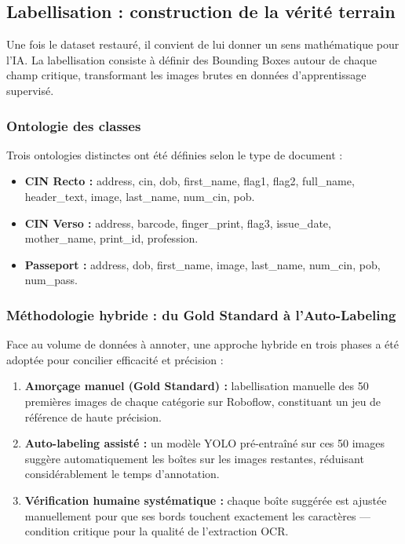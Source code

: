 \subsection{Labellisation : construction de la vérité terrain}
\label{subsec:labellisation}

Une fois le dataset restauré, il convient de lui donner un sens mathématique pour l'IA. La labellisation consiste à définir des Bounding Boxes autour de chaque champ critique, transformant les images brutes en données d'apprentissage supervisé.

\subsubsection{Ontologie des classes}

Trois ontologies distinctes ont été définies selon le type de document :

\begin{itemize}
  \item \textbf{CIN Recto :} address, cin, dob, first\_name, flag1, flag2, full\_name, header\_text, image, last\_name, num\_cin, pob.

  \item \textbf{CIN Verso :} address, barcode, finger\_print, flag3, issue\_date, mother\_name, print\_id, profession.

  \item \textbf{Passeport :} address, dob, first\_name, image, last\_name, num\_cin, pob, num\_pass.
\end{itemize}

\subsubsection{Méthodologie hybride : du Gold Standard à l'Auto-Labeling}

Face au volume de données à annoter, une approche hybride en trois phases a été adoptée pour concilier efficacité et précision :

\begin{enumerate}
  \item \textbf{Amorçage manuel (Gold Standard) :} labellisation manuelle des 50 premières images de chaque catégorie sur Roboflow, constituant un jeu de référence de haute précision.

  \item \textbf{Auto-labeling assisté :} un modèle YOLO pré-entraîné sur ces 50 images suggère automatiquement les boîtes sur les images restantes, réduisant considérablement le temps d'annotation.

  \item \textbf{Vérification humaine systématique :} chaque boîte suggérée est ajustée manuellement pour que ses bords touchent exactement les caractères --- condition critique pour la qualité de l'extraction OCR.
\end{enumerate}

